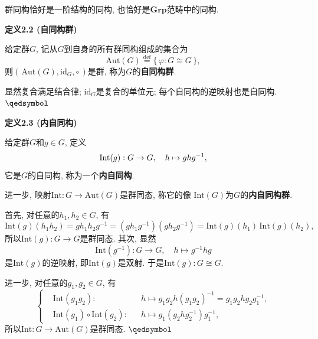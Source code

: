\documentclass[UTF8]{ctexart}
\begin{document}
群同构恰好是一阶结构的同构, 也恰好是$\mathbf{Grp}$范畴中的同构.

\vspace{10pt}

\hypertarget{sec:定义2.2}{}
\noindent\textbf{定义2.2 (自同构群)}

给定群$G$, 记从$G$到自身的所有群同构组成的集合为
\[
    \mathrm{Aut}(G)\overset{\mathrm{def}}{=}\{\,\varphi:G\cong G\,\},
\]
则$(\,\mathrm{Aut}(G),\mathrm{id}_G,\circ\,)$是群, 称为$G$的\textbf{自同构群}.


显然复合满足结合律; $\mathrm{id}_G$是复合的单位元; 每个自同构的逆映射也是自同构.
\hfill $\qedsymbol$

\vspace{10pt}

\hypertarget{sec:定义2.3}{}
\noindent\textbf{定义2.3 (内自同构)}

给定群$G$和$g\in G$, 定义
\vspace{-3pt}
\[
    \mathrm{Int}(g):G\to G,\quad h\mapsto ghg^{-1},\\[-3pt]
\]
它是$G$的自同构, 称为一个\textbf{内自同构}.

进一步, 映射$\mathrm{Int}:G\to\mathrm{Aut}(G)$是群同态, 称它的像
$\mathrm{Int}(G)$为$G$的\textbf{内自同构群}.


首先, 对任意的$h_1,h_2\in G$, 有
\[
    \mathrm{Int}(g)(h_1h_2)=gh_1h_2g^{-1}=(gh_1g^{-1})(gh_2g^{-1})
    =\mathrm{Int}(g)(h_1)\,\mathrm{Int}(g)(h_2),
\]
所以$\mathrm{Int}(g):G\to G$是群同态. 其次, 显然
\[
    \mathrm{Int}(g^{-1}):G\to G,\quad h\mapsto g^{-1}hg
\]
是$\mathrm{Int}(g)$的逆映射, 即$\mathrm{Int}(g)$是双射.
于是$\mathrm{Int}(g):G\cong G$.

进一步, 对任意的$g_1,g_2\in G$, 有
\[\left\{\begin{aligned}
    &\mathrm{Int}(g_1g_2):&&h\mapsto
    g_1g_2h(g_1g_2)^{-1}=g_1g_2hg_2g_1^{-1},\\[-3pt]
    &\mathrm{Int}(g_1)\circ\mathrm{Int}(g_2):&&h\mapsto
    g_1(g_2hg_2^{-1})g_1^{-1},
\end{aligned}\right.\]
所以$\mathrm{Int}:G\to\mathrm{Aut}(G)$是群同态. \hfill $\qedsymbol$
\end{document}
